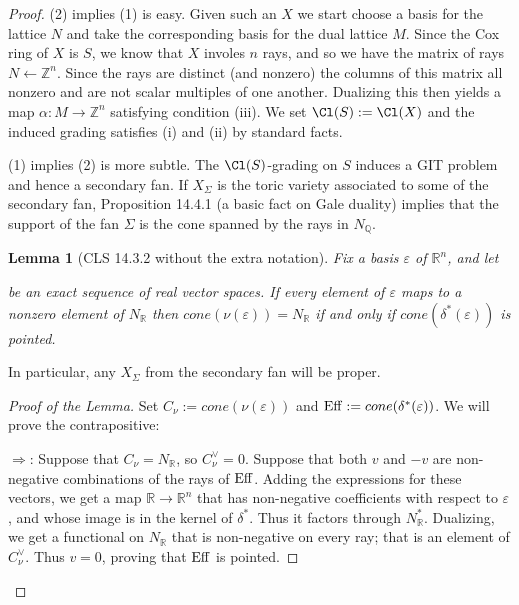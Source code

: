 \documentclass[11pt]{amsart}
\numberwithin{equation}{section}
\newtheorem{lemma}[equation]{Lemma}
\theoremstyle{definition}
\theoremstyle{remark}
\newcommand{\ZZ}{\mathbb Z}
\newcommand{\QQ}{\mathbb Q}
\newcommand{\RR}{\mathbb R}
\newcommand{\Eff}{\operatorname{Eff}}
\def\epsilon{\varepsilon}
\begin{document}
\begin{proof}
    (2) implies (1) is easy.  Given such an $X$ we start choose a basis for the lattice $N$ and take the corresponding basis for the dual lattice $M$.  Since the Cox ring of $X$ is $S$, we know that $X$ involes $n$ rays, and so we have the matrix of rays $N\gets \ZZ^n$.  Since the rays are distinct (and nonzero) the columns of this matrix all nonzero and are not scalar multiples of one another. Dualizing this then yields a map $\alpha\colon M\to \ZZ^n$ satisfying condition (iii).  We set $\Cl(S):=\Cl(X)$ and the induced grading satisfies (i) and (ii) by standard facts.
    
    (1) implies (2) is more subtle.  The $\Cl(S)$-grading on $S$ induces a GIT problem and hence a secondary fan.  If $X_{\Sigma}$ is the toric variety associated to some of the secondary fan, Proposition 14.4.1 (a basic fact on Gale duality) implies that the support of the fan $\Sigma$ is the cone spanned by the rays in $N_{\QQ}$.

    \begin{lemma}[CLS 14.3.2 without the extra notation]
     Fix a basis $\epsilon$ of $\RR^n$, and let
    be an exact sequence of real vector spaces. If every element of $\epsilon$ maps
    to a nonzero element of $N_\RR$ then $ cone(\nu(\epsilon)) = N_\RR$
    if and only if $cone(\delta^*(\epsilon))$ is pointed.
    \end{lemma} 
    In particular, any $X_{\Sigma}$ from the secondary fan will be proper.

    \def\Eff{{\rm Eff}}
    
    \begin{proof}[Proof of the Lemma] Set $C_\nu :=cone(\nu(\epsilon))$ and
    $\Eff := cone(\delta^*(\epsilon))$. We will prove the contrapositive: 
    
    \noindent $\Rightarrow$: Suppose that $C_\nu = N_\RR$, so $C_\nu^\vee = 0$.
    Suppose that both $v$ and $-v$ are non-negative combinations of the rays
    of $\Eff$. Adding the expressions for these vectors, we get a map $\RR \to \RR^n$ that has non-negative coefficients
    with respect to $\epsilon$, and whose image is in the kernel of $\delta^*$.
    Thus it factors through $N_\RR^*$. Dualizing, we get a functional on
    $N_\RR$ that is non-negative on every ray; that is an element
    of $C_\nu^\vee$. Thus $v = 0$, proving that $\Eff$ is pointed.
  

\end{proof}
\end{proof}
\end{document}
